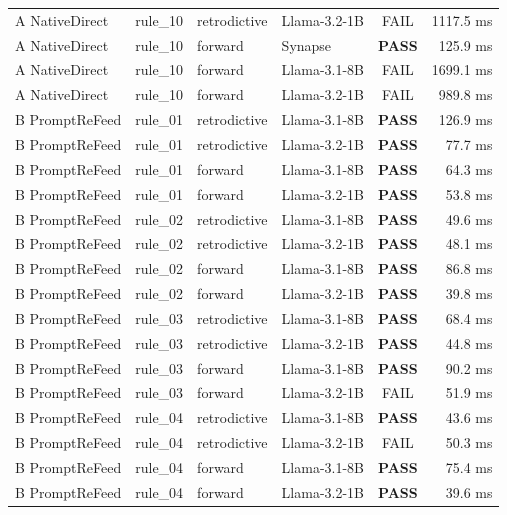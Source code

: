 {\begin{longtable}{p{2.2cm} p{1.2cm} p{2.0cm} p{3.8cm} c r}
A NativeDirect & rule\_10 & retrodictive & Llama-3.2-1B & \color{gray}FAIL & 1117.5 ms \\
A NativeDirect & rule\_10 & forward & Synapse & \textbf{\color{passgreen}PASS} & 125.9 ms \\
A NativeDirect & rule\_10 & forward & Llama-3.1-8B & \color{gray}FAIL & 1699.1 ms \\
A NativeDirect & rule\_10 & forward & Llama-3.2-1B & \color{gray}FAIL & 989.8 ms \\
B PromptReFeed & rule\_01 & retrodictive & Llama-3.1-8B & \textbf{\color{passgreen}PASS} & 126.9 ms \\
B PromptReFeed & rule\_01 & retrodictive & Llama-3.2-1B & \textbf{\color{passgreen}PASS} & 77.7 ms \\
B PromptReFeed & rule\_01 & forward & Llama-3.1-8B & \textbf{\color{passgreen}PASS} & 64.3 ms \\
B PromptReFeed & rule\_01 & forward & Llama-3.2-1B & \textbf{\color{passgreen}PASS} & 53.8 ms \\
B PromptReFeed & rule\_02 & retrodictive & Llama-3.1-8B & \textbf{\color{passgreen}PASS} & 49.6 ms \\
B PromptReFeed & rule\_02 & retrodictive & Llama-3.2-1B & \textbf{\color{passgreen}PASS} & 48.1 ms \\
B PromptReFeed & rule\_02 & forward & Llama-3.1-8B & \textbf{\color{passgreen}PASS} & 86.8 ms \\
B PromptReFeed & rule\_02 & forward & Llama-3.2-1B & \textbf{\color{passgreen}PASS} & 39.8 ms \\
B PromptReFeed & rule\_03 & retrodictive & Llama-3.1-8B & \textbf{\color{passgreen}PASS} & 68.4 ms \\
B PromptReFeed & rule\_03 & retrodictive & Llama-3.2-1B & \textbf{\color{passgreen}PASS} & 44.8 ms \\
B PromptReFeed & rule\_03 & forward & Llama-3.1-8B & \textbf{\color{passgreen}PASS} & 90.2 ms \\
B PromptReFeed & rule\_03 & forward & Llama-3.2-1B & \color{gray}FAIL & 51.9 ms \\
B PromptReFeed & rule\_04 & retrodictive & Llama-3.1-8B & \textbf{\color{passgreen}PASS} & 43.6 ms \\
B PromptReFeed & rule\_04 & retrodictive & Llama-3.2-1B & \color{gray}FAIL & 50.3 ms \\
B PromptReFeed & rule\_04 & forward & Llama-3.1-8B & \textbf{\color{passgreen}PASS} & 75.4 ms \\
B PromptReFeed & rule\_04 & forward & Llama-3.2-1B & \textbf{\color{passgreen}PASS} & 39.6 ms \\

\end{longtable}}
